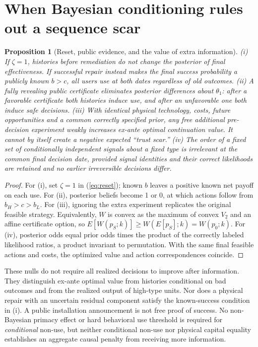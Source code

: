 \documentclass[11pt]{article}
\newtheorem{proposition}{Proposition}
\begin{document}
\section{When Bayesian conditioning rules out a sequence scar}\label{sec:impossibility}
\begin{proposition}[Reset, public evidence, and the value of extra information]\label{prop:impossible}
(i) If $\zeta=1$, histories before remediation do not change the posterior of final effectiveness. If successful repair instead makes the final success probability a publicly known $b>c$, all users use at both dates regardless of old outcomes. (ii) A fully revealing public certificate eliminates posterior differences about $\theta_1$: after a favorable certificate both histories induce use, and after an unfavorable one both induce safe decisions. (iii) With identical physical technology, costs, future opportunities and a common correctly specified prior, any free additional pre-decision experiment weakly increases ex-ante optimal continuation value. It cannot by itself create a negative expected ``trust scar.'' (iv) The order of a fixed set of conditionally independent signals about a fixed type is irrelevant at the common final decision date, provided signal identities and their correct likelihoods are retained and no earlier irreversible decisions differ.
\end{proposition}
\begin{proof}
For (i), set $\zeta=1$ in (\ref{eq:reset}); known $b$ leaves a positive known net payoff on each use. For (ii), posterior beliefs become 1 or 0, at which actions follow from $b_H>c>b_L$. For (iii), ignoring the extra experiment replicates the original feasible strategy. Equivalently, $W$ is convex as the maximum of convex $V_2$ and an affine certificate option, so $E[W(p_S;k)]\geq W(E[p_S];k)=W(p_0;k)$. For (iv), posterior odds equal prior odds times the product of the correctly labeled likelihood ratios, a product invariant to permutation. With the same final feasible actions and costs, the optimized value and action correspondences coincide.
\end{proof}
These nulls do not require all realized decisions to improve after information. They distinguish ex-ante optimal value from histories conditional on bad outcomes and from the realized output of high-type units. Nor does a physical repair with an uncertain residual component satisfy the known-success condition in (i). A public installation announcement is not free proof of success. No non-Bayesian primacy effect or hard behavioral use threshold is required for \emph{conditional} non-use, but neither conditional non-use nor physical capital equality establishes an aggregate causal penalty from receiving more information.
\end{document}
